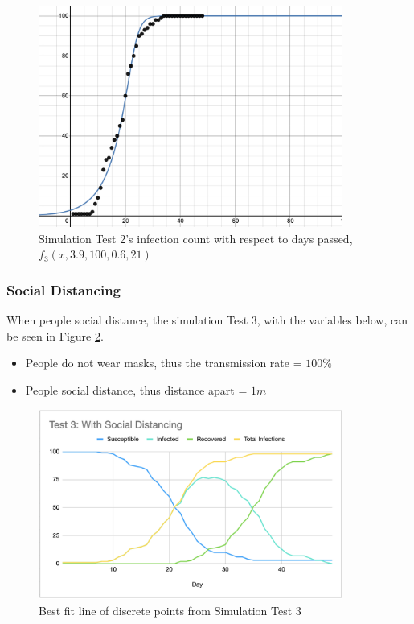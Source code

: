 \documentclass[a4paper,titlepage]{article}
\begin{document}
\begin{figure}[htbp]
    \centering
    \includegraphics[width=10cm]{simG2.png}
    \caption{Simulation Test 2's infection count with respect to days passed, $f_3(x,3.9,100,0.6,21)$}
    \label{fig:simG2}
\end{figure}

\subsubsection{Social Distancing}

When people social distance, the simulation Test 3, with the variables below, can be seen in Figure \ref{fig:simT3}.

\begin{itemize}
    \item People do not wear masks, thus the transmission rate = $100\%$
    \item People social distance, thus distance apart = $1\si{m}$
\end{itemize}

\begin{figure}[htbp]
    \centering
    \includegraphics[width=10cm]{simT3.png}
    \caption{Best fit line of discrete points from Simulation Test 3}
    \label{fig:simT3}
\end{figure}
\end{document}
